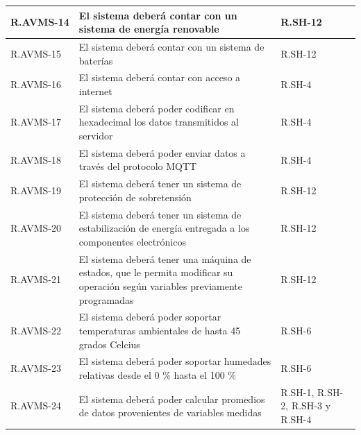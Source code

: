 \documentclass{article}%
\begin{document}
\begin{longtable}{|p{2cm}|p{9cm}|p{2.7cm}|}
\hline%
R.AVMS{-}14& El sistema deberá contar con un sistema de energía renovable&R.SH{-}12\\%
\hline%
R.AVMS{-}15& El sistema deberá contar con un sistema de baterías&R.SH{-}12\\%
\hline%
R.AVMS{-}16& El sistema deberá contar con acceso a internet&R.SH{-}4\\%
\hline%
R.AVMS{-}17& El sistema deberá poder codificar en hexadecimal los datos transmitidos al servidor&R.SH{-}4\\%
\hline%
R.AVMS{-}18& El sistema deberá poder enviar datos a través del protocolo MQTT&R.SH{-}4\\%
\hline%
R.AVMS{-}19& El sistema deberá tener un sistema de protección de sobretensión&R.SH{-}12\\%
\hline%
R.AVMS{-}20& El sistema deberá tener un sistema de estabilización de energía entregada a los componentes electrónicos&R.SH{-}12\\%
\hline%
R.AVMS{-}21& El sistema deberá tener una máquina de estados, que le permita modificar su operación según variables previamente programadas&R.SH{-}12\\%
\hline%
R.AVMS{-}22& El sistema deberá poder soportar temperaturas ambientales de hasta 45 grados Celcius&R.SH{-}6\\%
\hline%
R.AVMS{-}23& El sistema deberá poder soportar humedades relativas desde el 0 \% hasta el 100 \% &R.SH{-}6\\%
\hline%
R.AVMS{-}24& El sistema deberá poder calcular promedios de datos provenientes de variables medidas&R.SH{-}1, R.SH{-}2, R.SH{-}3 y R.SH{-}4\\%
\hline%
\end{longtable}

%
\newpage%
\end{document}
